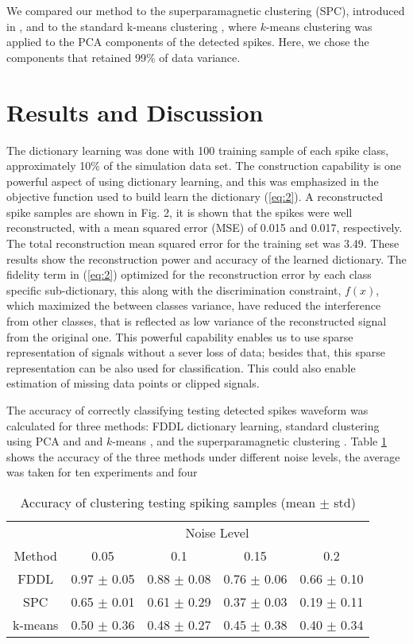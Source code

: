 \documentclass[conference]{IEEEtran}
\begin{document}
	We compared our method to the superparamagnetic clustering (SPC), introduced in \cite{quiroga2004unsupervised}, and to the standard k-means clustering \cite{lewicki1998review}, where $k$-means clustering was applied to the PCA components of the detected spikes. Here, we chose the components that retained 99\% of data variance.
	
 	\section{Results and Discussion} \label{sec:res_and_disc}
	The dictionary learning was done with 100 training sample of each spike class, approximately 10\% of the simulation data set. The construction capability is one powerful aspect of using dictionary learning, and this was emphasized in the objective function used to build learn the dictionary (\ref{eq:2}). A reconstructed spike samples are shown in Fig. 2, it is shown that the spikes were well reconstructed, with a mean squared error (MSE) of 0.015 and 0.017, respectively. The total reconstruction mean squared error for the training set was 3.49. These results show the reconstruction power and accuracy of the learned dictionary. The fidelity term in (\ref{eq:2}) optimized for the reconstruction error by each class specific sub-dictionary, this along with the discrimination constraint, $f(x)$, which maximized the between classes variance, have reduced the interference from other classes, that is reflected as low variance of the reconstructed signal from the original one. This powerful capability enables us to use sparse representation of signals without a sever loss of data; besides that, this sparse representation can be also used for classification. This could also enable estimation of missing data points or clipped signals.
	
	The accuracy of correctly classifying testing detected spikes waveform was calculated for three methods: FDDL dictionary learning, standard clustering using PCA and and $k$-means \cite{lewicki1998review}, and the superparamagnetic clustering \cite{quiroga2004unsupervised}. Table \ref{tab:acc_clust} shows the accuracy of the three methods under different noise levels, the average was taken for ten experiments and four
	
	\begin{table}
		\caption{Accuracy of clustering testing spiking samples (mean $\pm$ std)}
		\label{tab:acc_clust}
		\begin{tabularx}{\columnwidth}{c c c c c}
			\cmidrule{2-5}
			& \multicolumn{4}{c}{Noise Level} \\
			\cmidrule{2-5}
			Method & 0.05 & 0.1 & 0.15 & 0.2 \\
			\cmidrule[0.7pt]{1-5}
			FDDL & 0.97 $\pm$ 0.05 & 0.88 $\pm$ 0.08 & 0.76 $\pm$ 0.06 & 0.66 $\pm$ 0.10 \\
			SPC & 0.65 $\pm$ 0.01 & 0.61 $\pm$ 0.29 & 0.37 $\pm$ 0.03 & 0.19 $\pm$ 0.11 \\
			k-means & 0.50 $\pm$ 0.36 & 0.48 $\pm$ 0.27 & 0.45 $\pm$ 0.38 & 0.40 $\pm$ 0.34 \\
			\cmidrule[0.7pt]{1-5}
		\end{tabularx}
	\end{table}
\end{document}
